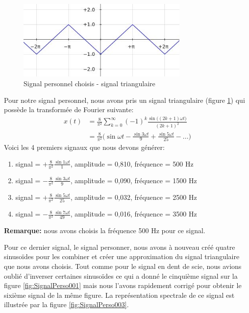 \documentclass[a4paper]{article}
\begin{document}
\begin{figure}[H]
    \centering
    \includegraphics[width=0.75\textwidth]{images/Triangle001.jpg}
    \caption{Signal personnel choisis - signal triangulaire}
    \label{fig:Triangle001}
\end{figure}





Pour notre signal personnel, nous avons pris un signal triangulaire (figure \ref{fig:Triangle001}) qui possède la transformée de Fourier suivante:
\[
    \begin{aligned}
        x(t) &= \frac{8}{\pi^2} \sum_{k=0}^{\infty} (-1)^k \frac{\sin \big( (2 k + 1) \omega t \big)}{(2 k + 1)^2} \\
        &= \frac{8}{\pi^2} \bigg( \sin \omega t - \frac{\sin 3 \omega t}{9} + \frac{\sin 5 \omega t}{25}  - ... \bigg)
    \end{aligned}
\]
Voici les 4 premiers signaux que nous devons générer:
\begin{enumerate}
    \item signal = $\displaystyle + \frac{8}{\pi^2} \frac{\sin 1 \omega t}{1} $, amplitude = 0,810, fréquence = 500 Hz
    \item signal = $\displaystyle - \frac{8}{\pi^2} \frac{\sin 3 \omega t}{9} $, amplitude = 0,090, fréquence = 1500 Hz
    \item signal = $\displaystyle + \frac{8}{\pi^2} \frac{\sin 5 \omega t}{25} $, amplitude = 0,032, fréquence = 2500 Hz
    \item signal = $\displaystyle - \frac{8}{\pi^2} \frac{\sin 7 \omega t}{49} $, amplitude = 0,016, fréquence = 3500 Hz
\end{enumerate}
\textbf{Remarque:} nous avons choisis la fréquence 500 Hz pour ce signal.






Pour ce dernier signal, le signal personner, nous avons à nouveau créé quatre sinusoïdes pour les combiner et créer une approximation du signal triangulaire que nous avons choisis. Tout comme pour le signal en dent de scie, nous avions oublié d'inverser certaines sinusoïdes ce qui a donné le cinquième signal sur la figure \ref{fig:SignalPerso001} mais nous l'avons rapidement corrigé pour obtenir le sixième signal de la même figure. La représentation spectrale de ce signal est illustrée par la figure \ref{fig:SignalPerso003}.
\end{document}
